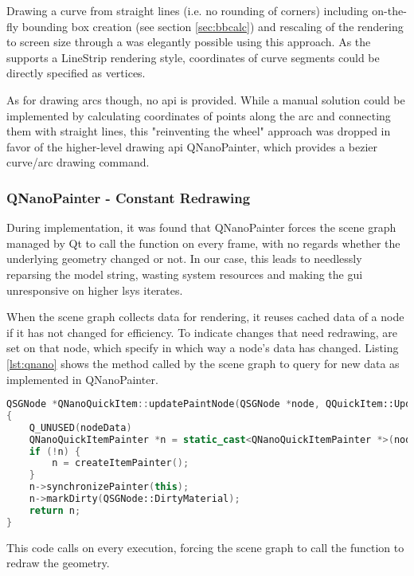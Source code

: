 Drawing a curve from straight lines (i.e. no rounding of corners) including on-the-fly \gls{bounding box} creation (see section \ref{sec:bbcalc}) and rescaling of the rendering to screen size through a  was elegantly possible using this approach. As the  supports a LineStrip rendering style, coordinates of curve segments could be directly specified as vertices.

As for drawing arcs though, no \gls{api} is provided. While a manual solution could be implemented by calculating coordinates of points along the arc and connecting them with straight lines, this "reinventing the wheel" approach was dropped in favor of the higher-level drawing \gls{api} QNanoPainter, which provides a bezier curve/arc drawing command. 

\subsubsection{QNanoPainter - Constant Redrawing}
During implementation, it was found that QNanoPainter forces the scene graph managed by Qt to call the  function on every frame, with no regards whether the underlying geometry changed or not. In our case, this leads to needlessly reparsing the model string, wasting system resources and making the \gls{gui} unresponsive on higher \gls{lsys} iterates.

When the scene graph collects data for rendering, it reuses cached data of a node if it has not changed for efficiency. To indicate changes that need redrawing,  are set on that node, which specify in which way a node's data has changed. Listing \ref{lst:qnano} shows the method called by the scene graph to query for new data as implemented in QNanoPainter. 

\begin{lstlisting}[language=c++,caption=QNanoQuickItem as of commit de45f31e,label=lst:qnano,float]
QSGNode *QNanoQuickItem::updatePaintNode(QSGNode *node, QQuickItem::UpdatePaintNodeData *nodeData)
{
    Q_UNUSED(nodeData)
    QNanoQuickItemPainter *n = static_cast<QNanoQuickItemPainter *>(node);
    if (!n) {
        n = createItemPainter();
    }
    n->synchronizePainter(this);
    n->markDirty(QSGNode::DirtyMaterial);
    return n;
}
\end{lstlisting}
This code calls  on every execution, forcing the scene graph to call the  function to redraw the geometry.

